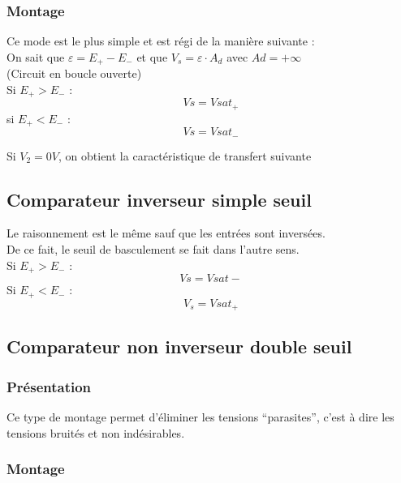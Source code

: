 \subsubsection{Montage}


Ce mode est le plus simple et est régi de la manière suivante : \\

On sait que $\varepsilon = E_+ - E_-$ et que $V_s=\varepsilon \cdot A_d$ avec $Ad=+\infty$ \\
(Circuit en boucle ouverte) \\


Si $E_+>E_-$ :
$$Vs=Vsat_+$$ 
 si $E_+<E_-$ :
$$Vs=Vsat_-$$

Si $V_2=0V$, on obtient la caractéristique de transfert suivante  



\subsection{Comparateur inverseur simple seuil}

Le raisonnement est le même sauf que les entrées sont inversées. \\
De ce fait, le seuil de basculement se fait dans l’autre sens. \\

Si $E_+>E_-$ :
$$Vs=Vsat-$$
Si $E_+<E_-$ :
$$V_s=Vsat_+$$

\subsection{Comparateur non inverseur double seuil}


\subsubsection{Présentation}

Ce type de montage permet d’éliminer les tensions “parasites”, c’est à dire les tensions bruités et non indésirables. \\

\subsubsection{Montage}


